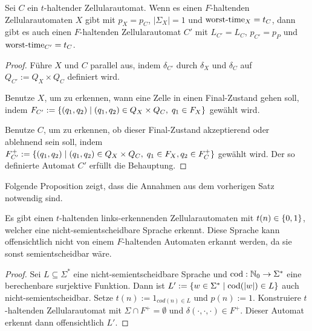\begin{satz}
    Sei $C$ ein $t$-haltender Zellularautomat.
    Wenn es einen $F$-haltenden Zellularautomaten $X$ gibt
    mit $p_X = p_C$, $|\Sigma_X| = 1$ und $\operatorname{worst-time}_X = t_C$,
    dann gibt es auch einen $F$-haltenden Zellularautomat $C'$ mit $L_{C'} = L_C$, $p_{C'} = p_P$ und $\operatorname{worst-time}_{C'} = t_C$.
\end{satz}
\begin{proof}
    Führe $X$ und $C$ parallel aus, indem $\delta_{C'}$ durch $\delta_X$ und $\delta_C$ auf $Q_{C'} := Q_X \times Q_C$ definiert wird.
    
    Benutze $X$, um zu erkennen, wann eine Zelle in einen Final-Zustand gehen soll,
    indem $F_{C'} := \{ { (q_1, q_2) } \; | \; { (q_1, q_2) \in Q_X \times Q_C, \; q_1 \in F_X } \} $ gewählt wird.
    
    Benutze $C$, um zu erkennen, ob dieser Final-Zustand akzeptierend oder ablehnend sein soll,
    indem $F_{C'}^+ := \{ { (q_1, q_2) } \; | \; { (q_1, q_2) \in Q_X \times Q_C, \; q_1 \in F_X, q_2 \in F_C^+} \} $ gewählt wird.
    Der so definierte Automat $C'$ erfüllt die Behauptung.
\end{proof}

Folgende Proposition zeigt, dass die Annahmen aus dem vorherigen Satz notwendig sind.

\begin{proposition}
    Es gibt einen $t$-haltenden links-erkennenden Zellularautomaten mit
    $t(n) \in \{ {0, 1} \}$,
    welcher eine nicht-semientscheidbare Sprache erkennt.
    Diese Sprache kann offensichtlich nicht
    von einem $F$-haltenden Automaten erkannt werden,
    da sie sonst semientscheidbar wäre.
\end{proposition}
\begin{proof}
    Sei $L \subseteq \Sigma^*$ eine nicht-semientscheidbare Sprache und $\mathrm{cod}: \mathbb{N}_0 \to \Sigma^*$ eine berechenbare surjektive Funktion.
    Dann ist $L' := \{ { w \in \Sigma^* } \; | \; { \mathrm{cod}(|w|) \in L } \}$ auch nicht-semientscheidbar.
    Setze $t(n) := 1_{cod(n) \in L}$ und $p(n) := 1$.
    Konstruiere $t$-haltenden Zellularautomat mit $\Sigma \cap F^+ = \emptyset$ und $\delta(\cdot, \cdot, \cdot) \in F^+$.
    Dieser Automat erkennt dann offensichtlich $L'$.
\end{proof}

\begin{comment}
    \begin{proposition}
        Sei $C$ ein $F$-haltender links-erkennender Zellularautomat und $n_0 \in \N$ so, dass $\cworsttime_C(n_0) < n_0$.
        Dann $\forall n \geq n_0: \cworsttime_C(n) = \cworsttime_C(n_0)$.
    \end{proposition}
    \begin{proof}
        Bei der Eingabe eines Wortes $w$ der Länge $n_0$ merkt $C$ nicht mehr, wenn $w$ verlängert wird.
        Ausführlicherer Beweis folgt.
    \end{proof}
\end{comment}


